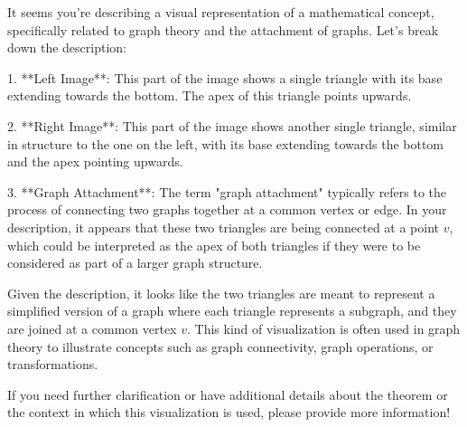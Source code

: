 It seems you're describing a visual representation of a mathematical concept, specifically related to graph theory and the attachment of graphs. Let's break down the description:

1. **Left Image**: This part of the image shows a single triangle with its base extending towards the bottom. The apex of this triangle points upwards.

2. **Right Image**: This part of the image shows another single triangle, similar in structure to the one on the left, with its base extending towards the bottom and the apex pointing upwards.

3. **Graph Attachment**: The term "graph attachment" typically refers to the process of connecting two graphs together at a common vertex or edge. In your description, it appears that these two triangles are being connected at a point \(v\), which could be interpreted as the apex of both triangles if they were to be considered as part of a larger graph structure.

Given the description, it looks like the two triangles are meant to represent a simplified version of a graph where each triangle represents a subgraph, and they are joined at a common vertex \(v\). This kind of visualization is often used in graph theory to illustrate concepts such as graph connectivity, graph operations, or transformations.

If you need further clarification or have additional details about the theorem or the context in which this visualization is used, please provide more information!